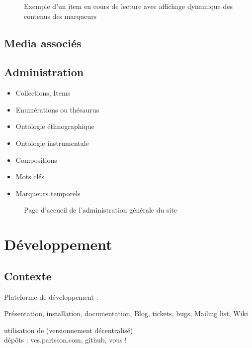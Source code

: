 \documentclass[a4paper,11pt,french]{article}
\begin{document}
\begin{figure}[htp]
    \centering
    \caption{Exemple d'un item en cours de lecture avec affichage dynamique des contenus des marqueurs}
    \label{item1}
\end{figure}

\subsection{Media associés}


\subsection{Administration}

\begin{itemize}
\item Collections, Items
\item Enumérations ou thésaurus
\item Ontologie éthnographique
\item Ontologie instrumentale
\item Compositions
\item Mots clés
\item Marqueurs temporels
\end{itemize}

\begin{figure}[htp]
    \centering
    \caption{Page d'accueil de l'administration générale du site}
    \label{item1}
\end{figure}



\section{Développement}

\subsection{Contexte}


Plateforme de développement : 

Présentation, installation, documentation, Blog, tickets, bugs, Mailing list, Wiki

utilisation de  (versionnement décentralisé) \\

dépôts : vcs.parisson.com, github, vous !
\end{document}
